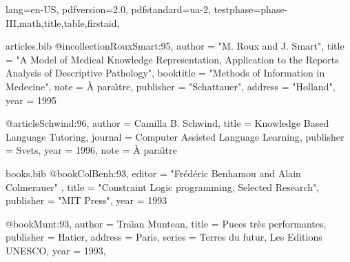 \DocumentMetadata
  {
    lang=en-US,
    pdfversion=2.0,
    pdfstandard=ua-2,
    testphase={phase-III,math,title,table,firstaid},
  }
\begin{filecontents}[overwrite]{articles.bib}
@incollection{RouxSmart:95,
    author    = "M. Roux and J. Smart",
    title     = "A Model of Medical Knowledge Representation, Application
                 to the Reports Analysis of Descriptive Pathology",
    booktitle = "Methods of Information in Medecine",
    note      = {\`A para\^{\i}tre},
    publisher = "Schattauer",
    address   = "Holland",
    year      = 1995
}

@article{Schwind:96,
    author    = {Camilla B. Schwind},
    title     = {Knowledge Based Language Tutoring},
    journal   = {Computer Assisted Language Learning},
    publisher = {Svets},
    year      = 1996,
    note      = {\`A para\^{\i}tre}
}
\end{filecontents}
\begin{filecontents}[overwrite]{books.bib}
@book{ColBenh:93,
   editor = "Fr\'ed\'eric Benhamou and Alain Colmerauer" ,
   title = "Constraint Logic programming, Selected Research",
   publisher = "MIT Press",
   year = 1993
}

@book{Munt:93,
   author =    {Tra{\"\i}an Muntean},
   title =     {Puces tr\`es performantes},
   publisher = {Hatier},
   address =   {Paris},
   series = {Terres du futur, Les Editions UNESCO},
   year =      1993,
}
\end{filecontents}

\documentclass[10pt]{article}
\usepackage{bibtopic}
\usepackage{hyperref}

